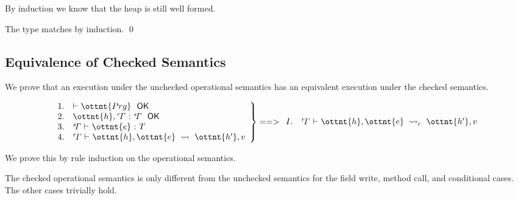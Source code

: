 By induction we know that the heap is still well formed.

The type matches by induction.
\qed


\subsection{Equivalence of Checked Semantics}

We prove that an execution under the unchecked operational semantics has an
equivalent execution under the checked semantics.

\begin{theorem}
\label{enerj:thm:cs}
\[
\left.
\begin{array}{ll}
1. &  \textsf{$\vdash$} \  \ottnt{Prg} \ \  \textsf{OK} \\
2. &  \ottnt{h} ,  \mathit{ {^r}\!\Gamma} \  \textsf{:} \  \mathit{ {^s}\!\Gamma} \ \  \textsf{OK} \\
3. &  \mathit{ {^s}\!\Gamma} \  \textsf{$\vdash$} \  \ottnt{e} \  \textsf{:} \  T \\
4. &  \mathit{ {^r}\!\Gamma} \  \textsf{$\vdash$} \  \ottnt{h} ,  \ottnt{e} \ \leadsto\  \ottnt{h'} ,  v \\
\end{array}
\right\} ==>
\begin{array}{ll}
I. &  \mathit{ {^r}\!\Gamma} \  \textsf{$\vdash$} \  \ottnt{h} ,  \ottnt{e} \ \leadsto_{c}\  \ottnt{h'} ,  v \\
\end{array}
\]
\end{theorem}


We prove this by rule induction on the operational semantics.

The checked operational semantics is only different from the unchecked
semantics for the field write, method call, and conditional cases.
The other cases trivially hold.



